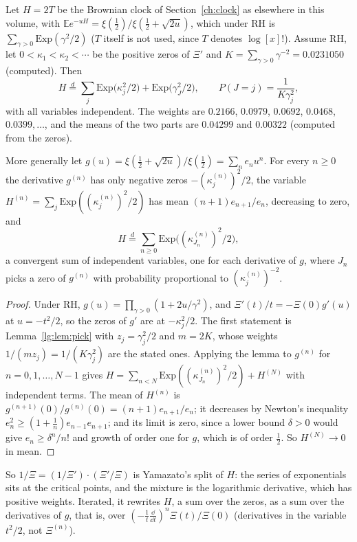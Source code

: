 \begin{theorem}\label{lg:thm:split}
Let $H=2T$ be the Brownian clock of Section~\ref{ch:clock} as elsewhere in this volume, with $\mathbb Ee^{-uH}=\xi(\frac12)/\xi(\frac12+\sqrt{2u})$, which under RH is $\sum_{\gamma>0}\mathrm{Exp}(\gamma^2/2)$ ($T$ itself is not used, since $T$ denotes $\log[x]!$). Assume RH, let $0<\kappa_1<\kappa_2<\cdots$ be the positive zeros of $\Xi'$ and $K=\sum_{\gamma>0}\gamma^{-2}=0.0231050$ (computed). Then
\[
H\overset d=\sum_j\mathrm{Exp}\bigl(\kappa_j^2/2\bigr)+\mathrm{Exp}\bigl(\gamma_J^2/2\bigr),\qquad P(J=j)=\frac{1}{K\gamma_j^2},
\]
with all variables independent. The weights are $0.2166$, $0.0979$, $0.0692$, $0.0468$, $0.0399,\dots$, and the means of the two parts are $0.04299$ and $0.00322$ (computed from the zeros).

More generally let $g(u)=\xi(\frac12+\sqrt{2u})/\xi(\frac12)=\sum_ne_nu^n$. For every $n\ge0$ the derivative $g^{(n)}$ has only negative zeros $-(\kappa^{(n)}_j)^2/2$, the variable $H^{(n)}=\sum_j\mathrm{Exp}((\kappa^{(n)}_j)^2/2)$ has mean $(n+1)e_{n+1}/e_n$, decreasing to zero, and
\[
H\overset d=\sum_{n\ge0}\mathrm{Exp}\bigl((\kappa^{(n)}_{J_n})^2/2\bigr),
\]
a convergent sum of independent variables, one for each derivative of $g$, where $J_n$ picks a zero of $g^{(n)}$ with probability proportional to $(\kappa^{(n)}_j)^{-2}$.
\end{theorem}
\begin{proof}
Under RH, $g(u)=\prod_{\gamma>0}(1+2u/\gamma^2)$, and $\Xi'(t)/t=-\Xi(0)g'(u)$ at $u=-t^2/2$, so the zeros of $g'$ are at $-\kappa_j^2/2$. The first statement is Lemma~\ref{lg:lem:pick} with $z_j=\gamma_j^2/2$ and $m=2K$, whose weights $1/(mz_j)=1/(K\gamma_j^2)$ are the stated ones. Applying the lemma to $g^{(n)}$ for $n=0,1,\dots,N-1$ gives $H=\sum_{n<N}\mathrm{Exp}((\kappa^{(n)}_{J_n})^2/2)+H^{(N)}$ with independent terms. The mean of $H^{(n)}$ is $g^{(n+1)}(0)/g^{(n)}(0)=(n+1)e_{n+1}/e_n$; it decreases by Newton's inequality $e_n^2\ge(1+\frac1n)e_{n-1}e_{n+1}$; and its limit is zero, since a lower bound $\delta>0$ would give $e_n\ge\delta^n/n!$ and growth of order one for $g$, which is of order $\frac12$. So $H^{(N)}\to0$ in mean.
\end{proof}
So $1/\Xi=(1/\Xi')\cdot(\Xi'/\Xi)$ is Yamazato's split of $H$: the series of exponentials sits at the critical points, and the mixture is the logarithmic derivative, which has positive weights. Iterated, it rewrites $H$, a sum over the zeros, as a sum over the derivatives of $g$, that is, over $(-\frac1t\frac{\dd}{\dd t})^n\Xi(t)/\Xi(0)$ (derivatives in the variable $t^2/2$, not $\Xi^{(n)}$).

